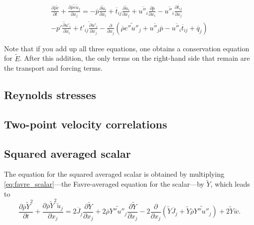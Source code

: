 \documentclass[oneside,a4paper,11pt]{report}
\newcommand{\rhoavg}{\overline{\rho}}
\newcommand{\pavg}{\overline{p}}
\newcommand{\qavg}{\overline{q}}
\newcommand{\tavg}{\overline{t}}
\newcommand{\wavg}{\overline{w}}
\newcommand{\Javg}{\overline{J}}
\newcommand{\pfluc}{p'}
\newcommand{\tfluc}{t'}
\newcommand{\ufluc}{u'}
\newcommand{\eavgf}{\widetilde{e}}
\newcommand{\uavgf}{\widetilde{u}}
\newcommand{\Eavgf}{\widetilde{E}}
\newcommand{\Yavgf}{\widetilde{Y}}
\newcommand{\eflucf}{e''}
\newcommand{\Yflucf}{Y''}
\newcommand{\uflucf}{u''}
\begin{document}
\begin{multline}
    \frac{\partial \rhoavg \eavgf}{\partial t} + \frac{\partial \rhoavg \eavgf \uavgf_j}{\partial x_j} = -\pavg \frac{\partial \uavgf_i}{\partial x_i} + \tavg_{ij} \frac{\partial \uavgf_i}{\partial x_j} + \overline{ \uflucf_i } \frac{\partial \pavg}{\partial x_i} - \overline{ \uflucf_i } \frac{\partial \tavg_{ij} }{\partial x_j} \\
    - \overline{ \pfluc \frac{\partial \ufluc_i}{\partial x_i} } + \overline{ \tfluc_{ij} \frac{\partial \ufluc_i}{\partial x_j} } - \frac{\partial}{\partial x_j} \left ( \rhoavg \widetilde{ \eflucf \uflucf_j }  +  \overline{ \uflucf_j } \pavg - \overline{ \uflucf_i } \tavg_{ij} + \qavg_j \right )
\end{multline}

Note that if you add up all three equations, one obtains a conservation equation for $\Eavgf$. After this addition, the only terms on the right-hand side that remain are the transport and forcing terms.
\subsection{Reynolds stresses}

\subsection{Two-point velocity correlations}

\subsection{Squared averaged scalar}
The equation for the squared averaged scalar is obtained by multiplying \cref{eq:favre_scalar}---the Favre-averaged equation for the scalar---by $\Yavgf$, which leads to
\begin{equation}
    \label{eq:squared_averaged_scalar_favre}
    \frac{\partial \rhoavg \Yavgf^2}{\partial t} + \frac{\partial \rhoavg \Yavgf^2 \uavgf_j}{\partial x_j} = 2 \Javg_j \frac{\partial \Yavgf}{\partial x_j} + 2 \rhoavg \widetilde{\Yflucf \uflucf_j} \frac{\partial \Yavgf}{\partial x_j} - 2\frac{\partial}{\partial x_j} \left ( \Yavgf \Javg_j + \Yavgf \rhoavg \widetilde{\Yflucf \uflucf_j} \right ) + 2 \Yavgf \wavg.
\end{equation}
\end{document}
